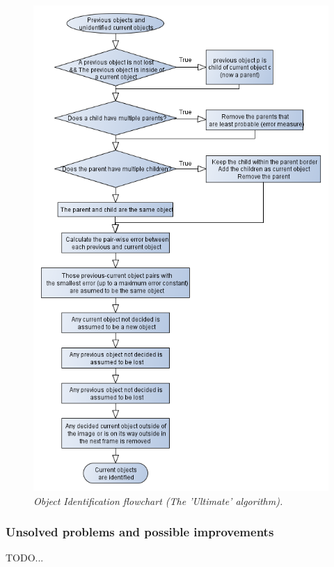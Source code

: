 \newpage
\begin{figure}[htb]
	\centering
	\includegraphics[width=116mm]{images/data_flow_identification.png}
	\caption{\textit{Object Identification flowchart (The 'Ultimate' algorithm).}}
	\label{fig:ObjID_fig} %
\end{figure}

\subsubsection{Unsolved problems and possible improvements}
TODO...